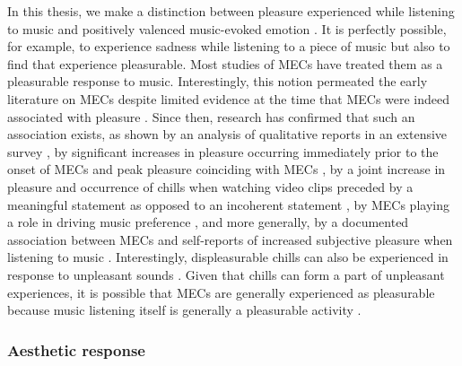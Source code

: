 In this thesis, we make a distinction between pleasure experienced while listening to music and positively valenced music-evoked emotion \parencite[see][]{schubert2013}. It is perfectly possible, for example, to experience sadness while listening to a piece of music but also to find that experience pleasurable. Most studies of MECs have treated them as a pleasurable response to music. Interestingly, this notion permeated the early literature on MECs despite limited evidence at the time that MECs were indeed associated with pleasure \parencite{goldstein1980, blood2001}. Since then, research has confirmed that such an association exists, as shown by an analysis of qualitative reports in an extensive survey \parencite{bannister2020a}, by significant increases in pleasure occurring immediately prior to the onset of MECs and peak pleasure coinciding with MECs \parencite{salimpoor2009}, by a joint increase in pleasure and occurrence of chills when watching video clips preceded by a meaningful statement as opposed to an incoherent statement \parencite{schoeller2016, schoeller2018a}, by MECs playing a role in driving music preference \parencite{schafer2010, schafer2011}, and more generally, by a documented association between MECs and self-reports of increased subjective pleasure when listening to music \parencite{grewe2007, grewe2009a, grewe2011, mori2014b, mori2015, mori2017, salimpoor2009, salimpoor2011, sumpf2015}. Interestingly, displeasurable chills can also be experienced in response to unpleasant sounds \parencite{grewe2011, grunkina2017, halpern1986, klepzig2020}. Given that chills can form a part of unpleasant experiences, it is possible that MECs are generally experienced as pleasurable because music listening itself is generally a pleasurable activity \parencite{dube2003}.

\subsubsection{Aesthetic response}

